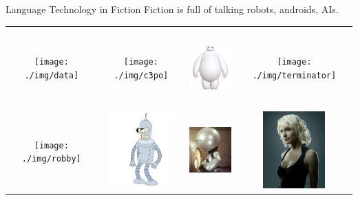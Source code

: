 \documentclass[xcolor={usenames,svgnames,x11names,dvipsnames,table}]{beamer}
\begin{document}
\begin{frame}{Language Technology in Fiction}
    Fiction is full of talking robots, androids, AIs.
    \begin{center}
        \begin{tabular}{cccc}
            \texttt{[image: ./img/data]} &
            \texttt{[image: ./img/c3po]} &
              \includegraphics[height=8em]{./img/baymax} &
            \texttt{[image: ./img/terminator]} \\
            \texttt{[image: ./img/robby]} &
            \includegraphics[height=8em]{./img/bender.jpg} &
            \includegraphics[height=8em]{./img/marvin} &
            \includegraphics[height=8em]{./img/number6}
        \end{tabular}
    \end{center}
\end{frame}
\end{document}
